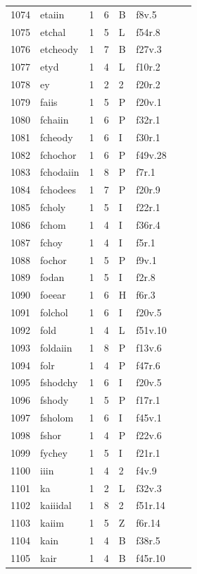 \documentclass[11pt,a4paper]{article}
\begin{document}
\begin{landscape}
\begin{longtable}{@{}r>{\ttfamily}lrrl>{\ttfamily}l>{\raggedright\arraybackslash}p{80mm}>{\raggedright\arraybackslash}p{36mm}@{}}
1074 & etaiin & 1 & 6 & B & f8v.5 &  & \\
1075 & etchal & 1 & 5 & L & f54r.8 &  & \\
1076 & etcheody & 1 & 7 & B & f27v.3 &  & \\
1077 & etyd & 1 & 4 & L & f10r.2 &  & \\
1078 & ey & 1 & 2 & 2 & f20r.2 &  & \\
1079 & faiis & 1 & 5 & P & f20v.1 &  & \\
1080 & fchaiin & 1 & 6 & P & f32r.1 &  & \\
1081 & fcheody & 1 & 6 & I & f30r.1 &  & \\
1082 & fchochor & 1 & 6 & P & f49v.28 &  & \\
1083 & fchodaiin & 1 & 8 & P & f7r.1 &  & \\
1084 & fchodees & 1 & 7 & P & f20r.9 &  & \\
1085 & fcholy & 1 & 5 & I & f22r.1 &  & \\
1086 & fchom & 1 & 4 & I & f36r.4 &  & \\
1087 & fchoy & 1 & 4 & I & f5r.1 &  & \\
1088 & fochor & 1 & 5 & P & f9v.1 &  & \\
1089 & fodan & 1 & 5 & I & f2r.8 &  & \\
1090 & foeear & 1 & 6 & H & f6r.3 &  & \\
1091 & folchol & 1 & 6 & I & f20v.5 &  & \\
1092 & fold & 1 & 4 & L & f51v.10 &  & \\
1093 & foldaiin & 1 & 8 & P & f13v.6 &  & \\
1094 & folr & 1 & 4 & P & f47r.6 &  & \\
1095 & fshodchy & 1 & 6 & I & f20v.5 &  & \\
1096 & fshody & 1 & 5 & P & f17r.1 &  & \\
1097 & fsholom & 1 & 6 & I & f45v.1 &  & \\
1098 & fshor & 1 & 4 & P & f22v.6 &  & \\
1099 & fychey & 1 & 5 & I & f21r.1 &  & \\
1100 & iiin & 1 & 4 & 2 & f4v.9 &  & \\
1101 & ka & 1 & 2 & L & f32v.3 &  & \\
1102 & kaiiidal & 1 & 8 & 2 & f51r.14 &  & \\
1103 & kaiim & 1 & 5 & Z & f6r.14 &  & \\
1104 & kain & 1 & 4 & B & f38r.5 &  & \\
1105 & kair & 1 & 4 & B & f45r.10 &  & \\

\end{longtable}
\end{landscape}
\end{document}
